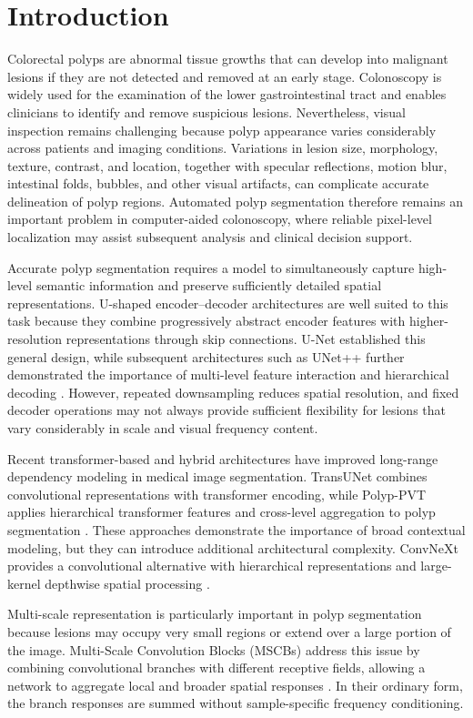 \section{Introduction}

Colorectal polyps are abnormal tissue growths that can develop into malignant lesions if they are not detected and removed at an early stage. Colonoscopy is widely used for the examination of the lower gastrointestinal tract and enables clinicians to identify and remove suspicious lesions. Nevertheless, visual inspection remains challenging because polyp appearance varies considerably across patients and imaging conditions. Variations in lesion size, morphology, texture, contrast, and location, together with specular reflections, motion blur, intestinal folds, bubbles, and other visual artifacts, can complicate accurate delineation of polyp regions. Automated polyp segmentation therefore remains an important problem in computer-aided colonoscopy, where reliable pixel-level localization may assist subsequent analysis and clinical decision support.

Accurate polyp segmentation requires a model to simultaneously capture high-level semantic information and preserve sufficiently detailed spatial representations. U-shaped encoder--decoder architectures are well suited to this task because they combine progressively abstract encoder features with higher-resolution representations through skip connections. U-Net established this general design, while subsequent architectures such as UNet++ further demonstrated the importance of multi-level feature interaction and hierarchical decoding \cite{unet,unetpp}. However, repeated downsampling reduces spatial resolution, and fixed decoder operations may not always provide sufficient flexibility for lesions that vary considerably in scale and visual frequency content.

Recent transformer-based and hybrid architectures have improved long-range dependency modeling in medical image segmentation. TransUNet combines convolutional representations with transformer encoding, while Polyp-PVT applies hierarchical transformer features and cross-level aggregation to polyp segmentation \cite{transunet,polyppvt}. These approaches demonstrate the importance of broad contextual modeling, but they can introduce additional architectural complexity. ConvNeXt provides a convolutional alternative with hierarchical representations and large-kernel depthwise spatial processing \cite{convnext}.

Multi-scale representation is particularly important in polyp segmentation because lesions may occupy very small regions or extend over a large portion of the image. Multi-Scale Convolution Blocks (MSCBs) address this issue by combining convolutional branches with different receptive fields, allowing a network to aggregate local and broader spatial responses \cite{emcad}. In their ordinary form, the branch responses are summed without sample-specific frequency conditioning.

